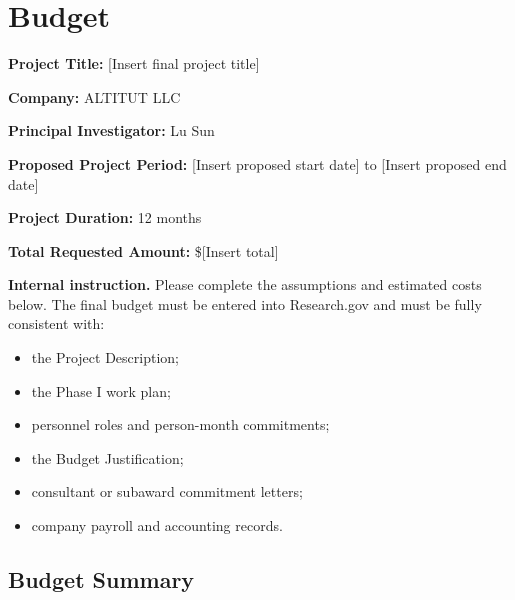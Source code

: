 \documentclass[11pt,letterpaper]{article}
\begin{document}
%

\section*{Budget}

\noindent
\textbf{Project Title:} [Insert final project title]

\noindent
\textbf{Company:} ALTITUT LLC

\noindent
\textbf{Principal Investigator:} Lu Sun

\noindent
\textbf{Proposed Project Period:} [Insert proposed start date] to
[Insert proposed end date]

\noindent
\textbf{Project Duration:} 12 months

\noindent
\textbf{Total Requested Amount:} \$[Insert total]

\medskip

\noindent
\textbf{Internal instruction.}
Please complete the assumptions and estimated costs below. The final budget
must be entered into Research.gov and must be fully consistent with:

\begin{itemize}
    \item the Project Description;
    \item the Phase I work plan;
    \item personnel roles and person-month commitments;
    \item the Budget Justification;
    \item consultant or subaward commitment letters;
    \item company payroll and accounting records.
\end{itemize}

\subsection*{Budget Summary}
\end{document}
